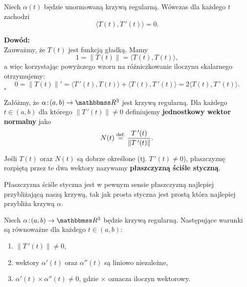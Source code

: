 \begin{frame}

\begin{lemat}
Niech $\alpha(t)$ będzie unormowaną krzywą regularną. Wówczas dla każdego $t$ zachodzi \[\langle T(t),T\,'(t)\rangle=0.\]
\end{lemat}

\pause\textcolor{ared}{\textbf{Dowód:}} \\
Zauważmy, że $T(t)$ jest funkcją gładką. Mamy \[1=\|T(t)\|=\langle T(t),T(t)\rangle,\]\pause a więc korzystając powyższego wzoru na różniczkowanie iloczynu skalarnego otrzymujemy:\pause\[0=\|T(t)\|'=\langle T\,'(t),T(t)\rangle+\langle T(t),T\,'(t)\rangle=2\langle T(t),T\,'(t)\rangle.\]
\hfill $\square$

\end{frame}
\begin{frame}

\begin{definicja}
Załóżmy, że $\alpha\colon (a,b)\to \R^3$ jest krzywą regularną. Dla każdego $t\in (a,b)$ dla którego $\|T\,'(t)\|\neq 0$ definiujemy \textbf{jednostkowy wektor normalny} jako \[N(t)\define \frac{T\,'(t)}{\|T\,'(t)\|}.\]

\pause Jeśli $T(t)$ oraz $N(t)$ są dobrze określone (tj. $T\,'(t)\neq 0$), płaszczyznę rozpiętą przez te dwa wektory nazywamy \textbf{płaszczyzną ściśle styczną}.
\end{definicja}
\medskip
\pause Płaszczyzna ściśle styczna jest w pewnym sensie płaszczyzną najlepiej przybliżającą naszą krzywą, tak jak prosta styczna jest prostą która najlepiej przybliża krzywą $\alpha$.

\end{frame}
\begin{frame}[<+->]

\begin{lemat}
Niech $\alpha\colon (a,b)\to \R^3$ będzie krzywą regularną. Następujące warunki są równoważne dla każdego $t\in (a,b)$:
\begin{enumerate}
\item $\|T\,'(t)\|\neq 0$,
\item wektory $\alpha'(t)$ oraz $\alpha''(t)$ są liniowo niezależne,
\item $\alpha'(t)\times \alpha''(t)\neq 0$, gdzie $\times$ oznacza iloczyn wektorowy.
\end{enumerate}
\end{lemat}


\end{frame}

